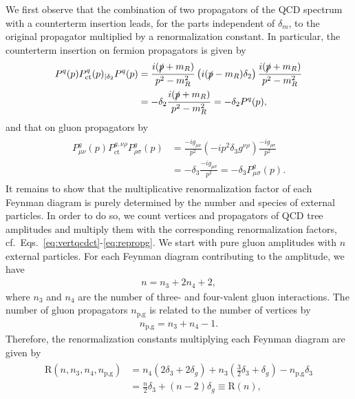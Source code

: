 We first observe that the combination of two propagators of the QCD spectrum with a counterterm
insertion leads, for the parts independent of $\delta_m$, to the original propagator
multiplied by a renormalization constant. In particular, the counterterm
insertion on fermion propagators is given by
\begin{align}\label{eq:repropq}
\begin{split}
  P^q(p)P_{\text{ct}}^q(p)_{|\delta_2} P^q(p)& =  \frac{i(\slashed{p}+m_R)}{p^2-m_R^2}\left(i(\slashed{p}-m_R)\delta_2\right) \frac{i(\slashed{p}+m_R)}{p^2-m_R^2}\\
  &=-\delta_2\frac{i(\slashed{p}+m_R)}{p^2-m_R^2} = -\delta_2 P^q(p),
\end{split}
\end{align}
and that on gluon propagators by
\begin{align}\label{eq:repropg}
\begin{split}
  P^g_{\mu\nu}(p) P^{g,\nu\rho}_{\text{ct}} P^g_{\rho\sigma}(p)& =  \frac{-ig_{\mu\nu}}{p^2} \left(-ip^2\delta_3 g^{\nu\rho}\right)  \frac{-ig_{\rho\sigma}}{p^2}\\
  &=-\delta_3\frac{-ig_{\mu\sigma}}{p^2} = -\delta_3P^g_{\mu\sigma}(p).
\end{split}
\end{align}
It remains to show that the multiplicative renormalization factor of each Feynman diagram is
purely determined by the number and species of external particles. In
order to do so, we count vertices and
propagators of QCD tree amplitudes and multiply them with the corresponding
renormalization factors,
cf.~Eqs.~\eqref{eq:vertqcdct}-\eqref{eq:repropg}. We start with pure gluon amplitudes with $n$
external particles. For each Feynman diagram contributing to the
amplitude, we have
\begin{align}\label{eq:gvert}
  n = n_3 + 2 n_4 + 2,
\end{align}
where $n_3$ and $n_4$ are the number of three- and four-valent gluon
interactions. The number of gluon propagators $n_{\text{p,g}}$ is
related to the number of vertices by
\begin{align}\label{eq:gprop}
  n_{\text{p,g}} = n_3+ n_4 -1.
\end{align}
Therefore, the renormalization constants multiplying each Feynman
diagram are given by
\begin{align}
\begin{split}
  \text{R}(n,n_3,n_4,n_{\text{p,g}}) &= n_4 \left( 2\delta_3 + 2\delta_g \right) +n_3 \left(
    \frac{3}{2} \delta_3 + \delta_g \right)-n_{\text{p,g}} \delta_3\\
&= \frac{n}{2}\delta_3 +(n-2)\delta_g \equiv \text{R}(n),
\end{split}
\end{align}

